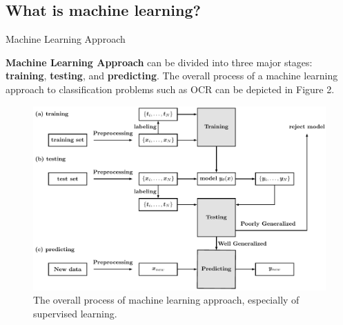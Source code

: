 \documentclass{bredelebeamer}
\begin{document}
\subsection{What is machine learning?}
\begin{frame}{Machine Learning Approach}
  \begin{justify}
    \textbf{Machine Learning Approach} can be divided into three major stages:
    \textbf{training}, \textbf{testing}, and \textbf{predicting}. The overall
    process of a machine learning approach to classification problems such as
    OCR can be depicted in Figure 2.
  \end{justify}
  \begin{figure}[h]
  \centering
  \includegraphics[scale=0.45]{desc_ml_approach.pdf}
  \caption{
    The overall process of machine learning approach, especially of supervised learning.
  }
  \end{figure}
\end{frame}
\end{document}
